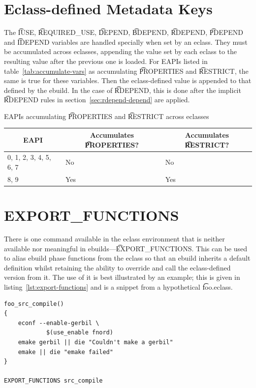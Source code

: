 \section{Eclass-defined Metadata Keys}

 The \t{IUSE}, \t{REQUIRED_USE}, \t{DEPEND}, \t{BDEPEND}, \t{RDEPEND},
\t{PDEPEND} and \t{IDEPEND} variables are handled specially when set by an eclass. They must be
accumulated across eclasses, appending the value set by each eclass to the resulting value after
the previous one is loaded. For EAPIs listed in table~\ref{tab:accumulate-vars} as accumulating
\t{PROPERTIES} and \t{RESTRICT}, the same is true for these variables. Then the eclass-defined
value is appended to that defined by the ebuild. In the case of \t{RDEPEND}, this is done after
the implicit \t{RDEPEND} rules in section~\ref{sec:rdepend-depend} are applied.

\begin{centertable}{EAPIs accumulating \t{PROPERTIES} and \t{RESTRICT} across eclasses}
    \label{tab:accumulate-vars}
    \begin{tabular}{lll}
      \toprule
      \multicolumn{1}{c}{\textbf{EAPI}} &
      \multicolumn{1}{c}{\textbf{Accumulates \t{PROPERTIES}?}} &
      \multicolumn{1}{c}{\textbf{Accumulates \t{RESTRICT}?}} \\
      \midrule
      0, 1, 2, 3, 4, 5, 6, 7  & No  & No  \\
      8, 9                    & Yes & Yes \\
      \bottomrule
    \end{tabular}
\end{centertable}

\section{EXPORT_FUNCTIONS}

There is one command available in the eclass environment that is neither available nor meaningful
in ebuilds---\t{EXPORT_FUNCTIONS}\@. This can be used to alias ebuild phase functions from the
eclass so that an ebuild inherits a default definition whilst retaining the ability to override and
call the eclass-defined version from it. The use of it is best illustrated by an example; this is
given in listing~\ref{lst:export-functions} and is a snippet from a hypothetical \t{foo.eclass}.

\begin{listing}
\caption{\t{EXPORT_FUNCTIONS} example: \t{foo.eclass}} \label{lst:export-functions}
\begin{verbatim}
foo_src_compile()
{
    econf --enable-gerbil \
            $(use_enable fnord)
    emake gerbil || die "Couldn't make a gerbil"
    emake || die "emake failed"
}

EXPORT_FUNCTIONS src_compile
\end{verbatim}
\end{listing}


